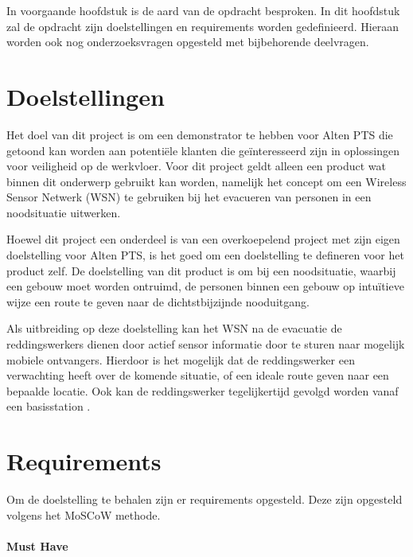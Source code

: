 \documentclass{../local}
\begin{document}
In voorgaande hoofdstuk is de aard van de opdracht besproken. In dit hoofdstuk zal de opdracht zijn doelstellingen en requirements worden gedefinieerd. Hieraan worden ook nog onderzoeksvragen opgesteld met bijbehorende deelvragen.

\section{Doelstellingen}
Het doel van dit project is om een demonstrator te hebben voor Alten PTS die getoond kan worden aan potentiële klanten die geïnteresseerd zijn in oplossingen voor veiligheid op de werkvloer. Voor dit project geldt alleen een product wat binnen dit onderwerp gebruikt kan worden, namelijk het concept om een Wireless Sensor Netwerk (WSN) te gebruiken bij het evacueren van personen in een noodsituatie uitwerken.

Hoewel dit project een onderdeel is van een overkoepelend project met zijn eigen doelstelling voor Alten PTS, is het goed om een doelstelling te defineren voor het product zelf. De doelstelling van dit product is om bij een noodsituatie, waarbij een gebouw moet worden ontruimd, de personen binnen een gebouw op intuïtieve wijze een route te geven naar de dichtstbijzijnde nooduitgang. 

Als uitbreiding op deze doelstelling kan het WSN na de evacuatie de reddingswerkers dienen door actief sensor informatie door te sturen naar mogelijk mobiele ontvangers. Hierdoor is het mogelijk dat de reddingswerker een verwachting heeft over de komende situatie, of een ideale route geven naar een bepaalde locatie. Ook kan de reddingswerker tegelijkertijd gevolgd worden vanaf een basisstation \cite{ShaWSN}.

\section{Requirements}
Om de doelstelling te behalen zijn er requirements opgesteld. Deze zijn opgesteld volgens het MoSCoW methode. 
\\\\
\noindent\textbf{Must Have}
\end{document}

